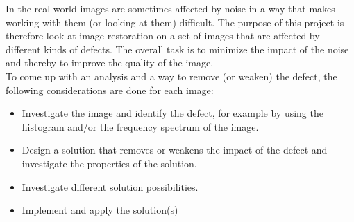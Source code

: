 In the real world images are sometimes affected by noise in a way that makes working with them (or looking at them) difficult. The purpose of this project is therefore look at image restoration on a set of images that are affected by different kinds of defects. The overall task is to minimize the impact of the noise and thereby to improve the quality of the image.\\[0.2cm]
To come up with an analysis and a way to remove (or weaken) the defect, the following considerations are done for each image: 
\begin{itemize}\itemsep-3pt
\item Investigate the image and identify the defect, for example by using the histogram and/or the frequency spectrum of the image.
\item Design a solution that removes or weakens the impact of the defect and investigate the properties of the solution. 
\item Investigate different solution possibilities.
\item Implement and apply the solution(s)
\end{itemize}

